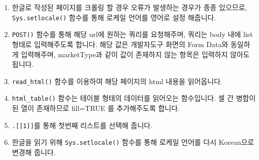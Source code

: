 \documentclass[12pt,]{book}
\newenvironment{Shaded}{\begin{snugshade}}{\end{snugshade}}
\newcommand{\DataTypeTok}[1]{\textcolor[rgb]{0.13,0.29,0.53}{#1}}
\newcommand{\DecValTok}[1]{\textcolor[rgb]{0.00,0.00,0.81}{#1}}
\newcommand{\KeywordTok}[1]{\textcolor[rgb]{0.13,0.29,0.53}{\textbf{#1}}}
\newcommand{\NormalTok}[1]{#1}
\newcommand{\OperatorTok}[1]{\textcolor[rgb]{0.81,0.36,0.00}{\textbf{#1}}}
\newcommand{\OtherTok}[1]{\textcolor[rgb]{0.56,0.35,0.01}{#1}}
\newcommand{\StringTok}[1]{\textcolor[rgb]{0.31,0.60,0.02}{#1}}
\providecommand{\tightlist}{%
  \setlength{\itemsep}{0pt}\setlength{\parskip}{0pt}}
\begin{document}
\begin{Shaded}
\end{Shaded}

\begin{enumerate}
\def\labelenumi{\arabic{enumi}.}
\tightlist
\item
  한글로 작성된 페이지를 크롤링 할 경우 오류가 발생하는 경우가 종종 있으므로, \texttt{Sys.setlocale()} 함수를 통해 로케일 언어를 영어로 설정 해줍니다.
\item
  \texttt{POST()} 함수를 통해 해당 url에 원하는 쿼리를 요청해주며, 쿼리는 body 내에 list 형태로 입력해주도록 합니다. 해당 값은 개발자도구 화면의 Form Data와 동일하게 입력해주며, marketType과 같이 값이 존재하지 않는 항목은 입력하지 않아도 됩니다.
\item
  \texttt{read\_html()} 함수를 이용하여 해당 페이지의 html 내용을 읽어옵니다.
\item
  \texttt{html\_table()} 함수는 테이블 형태의 데이터를 읽어오는 함수입니다. 셀 간 병합이 된 열이 존재하므로 fill=TRUE 를 추가해주도록 합니다.
\item
  \texttt{.{[}{[}1{]}{]}}를 통해 첫번째 리스트를 선택해 줍니다.
\item
  한글을 읽기 위해 \texttt{Sys.setlocale()} 함수를 통해 로케일 언어를 다시 Korean으로 변경해 줍니다.
\end{enumerate}
\end{document}
